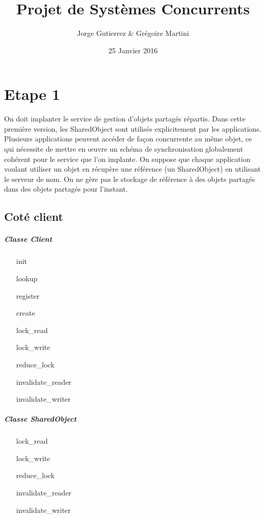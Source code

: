 \documentclass[a4paper,12pt]{article}
\title{Projet de Systèmes Concurrents}
\author{Jorge Gutierrez \& Grégoire Martini}
\date{25 Janvier 2016}
\begin{document}
\maketitle

\bigskip
\bigskip
\bigskip
\tableofcontents
\newpage


\section{Etape 1}

On doit implanter le service de gestion d'objets partagés répartis. Dans cette première version, les 
SharedObject sont utilisés explicitement par les applications. \\

Plusieurs applications peuvent accéder de façon concurrente au même objet, ce qui nécessite de mettre en 
œuvre un schéma de synchronisation globalement cohérent pour le service que l'on implante.
On suppose que chaque application voulant utiliser un objet en récupère une référence (un SharedObject) en 
utilisant le serveur de nom. On ne gère pas le stockage de référence à des objets partagés dans des objets partagés pour l'instant.

\subsection{Coté client}
\subparagraph{Classe Client}
\begin{itemize}
\item[init]
\item[lookup]
\item[register]
\item[create]
\item[lock\_read]
\item[lock\_write]
\item[reduce\_lock]
\item[invalidate\_reader]
\item[invalidate\_writer]
\end{itemize}

\subparagraph{Classe SharedObject}
\begin{itemize}
\item[lock\_read]
\item[lock\_write]
\item[reduce\_lock]
\item[invalidate\_reader]
\item[invalidate\_writer]
\end{itemize}
\end{document}
